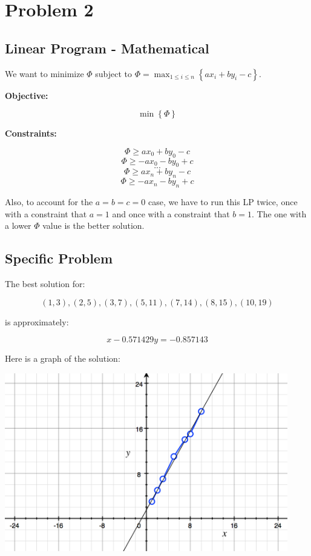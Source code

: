 \documentclass[12pt,letterpaper]{article}
\begin{document}
\newpage

\section*{Problem 2}

\subsection*{Linear Program - Mathematical}

We want to minimize $\Phi$ subject to $\Phi = \max_{1 \leq i \leq n}{\left \{ ax_i + by_i - c \right \}}$.

\textbf{Objective:}

$$
\min \left \{ \Phi \right \}
$$

\textbf{Constraints:}

$$
\Phi \geq ax_0 + by_0 - c
$$
$$
\Phi \geq - ax_0 - by_0 + c
$$
$$
...
$$
$$
\Phi \geq ax_n + by_n - c
$$
$$
\Phi \geq - ax_n - by_n + c
$$

Also, to account for the $a = b = c = 0$ case, we have to run this LP twice, once with a constraint that $a = 1$ and once with a constraint that $b = 1$. The one with a lower $\Phi$ value is the better solution.

\subsection*{Specific Problem}

The best solution for:

$$
(1,3), (2,5), (3,7), (5,11), (7,14), (8,15), (10,19)
$$

is approximately:

$$
x - 0.571429y = -0.857143
$$

\newpage

Here is a graph of the solution:

\includegraphics[width=350pt]{graph.png}
\end{document}
